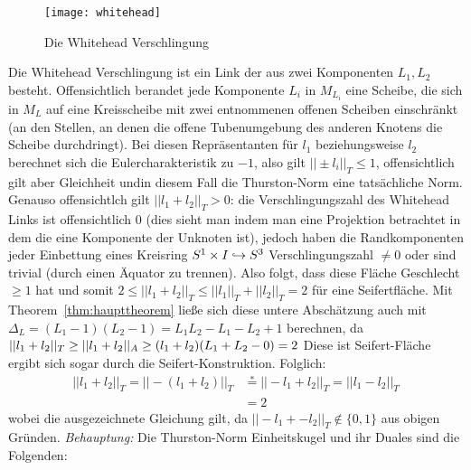         \begin{wrapfigure}{r}{0.4\textwidth}
            \centering
            \texttt{[image: whitehead]}
            \caption{Die Whitehead Verschlingung}
            \label{fig:whitehead}
        \end{wrapfigure}
        Die Whitehead Verschlingung ist ein Link der aus zwei Komponenten $L_1,L_2$ besteht. Offensichtlich berandet jede Komponente $L_i$ in $M_{L_i}$ eine Scheibe, die sich in $M_L$ auf eine Kreisscheibe mit zwei entnommenen offenen Scheiben einschränkt (an den Stellen, an denen die offene Tubenumgebung des anderen Knotens die Scheibe durchdringt). Bei diesen Repräsentanten für $l_1$ beziehungsweise $l_2$ berechnet sich die Eulercharakteristik zu $-1$, also gilt $||\pm l_i||_T\leq 1$, offensichtlich gilt aber Gleichheit undin diesem Fall die Thurston-Norm eine tatsächliche Norm. Genauso offensichtlch gilt $||l_1+l_2||_T>0$: die Verschlingungszahl des Whitehead Links ist offensichtlich $0$ (dies sieht man indem man eine Projektion betrachtet in dem die eine Komponente der Unknoten ist), jedoch haben die Randkomponenten jeder Einbettung eines Kreisring $S^1\times I \hookrightarrow S^3$ Verschlingungszahl $\neq 0$ oder sind trivial (durch einen Äquator zu trennen). Also folgt, dass diese Fläche Geschlecht $\ge 1$ hat und somit $2 \leq ||l_1+l_2||_T \leq ||l_1||_T+||l_2||_T =2$ für eine Seifertfläche. Mit Theorem~\ref{thm:haupttheorem} ließe sich diese untere Abschätzung auch mit $\Delta_L = (L_1-1)(L_2-1) = L_1L_2 -L_1-L_2+1$ berechnen, da $||l_1+l_2||_T \geq ||l_1+l_2||_A \geq (l_1+l_2) (L_1+L_2-0)=2$ Diese ist Seifert-Fläche ergibt sich sogar durch die Seifert-Konstruktion. Folglich:
        \begin{align*}
            ||l_1+l_2||_T =||-(l_1+l_2)||_T &\stackrel * = ||-l_1+l_2||_T = ||l_1-l_2||_T \\
            &=2
        \end{align*}
        wobei die ausgezeichnete Gleichung gilt, da $||-l_1+-l_2||_T\not \in \{0,1\}$ aus obigen Gründen.
        \emph{Behauptung:} Die Thurston-Norm Einheitskugel und ihr Duales sind die Folgenden:\\
